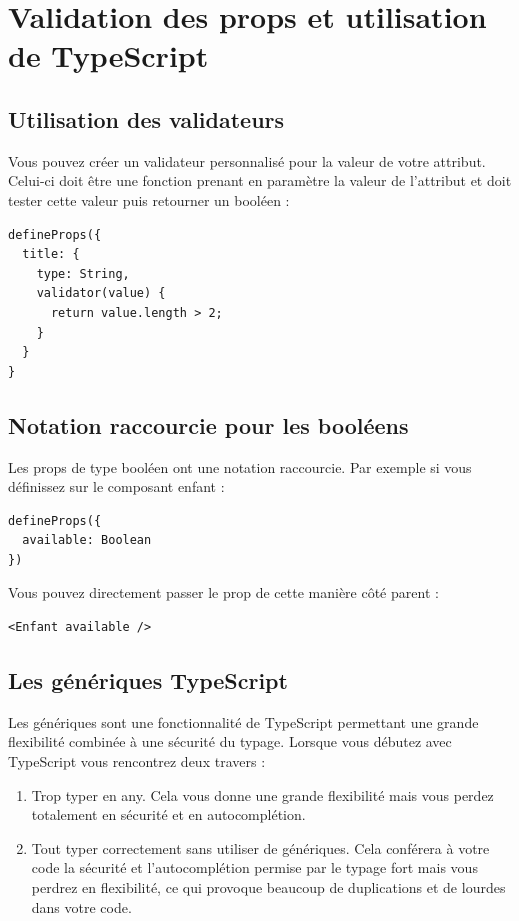 

\section{Validation des props et utilisation de TypeScript}
\subsection{Utilisation des validateurs}
Vous pouvez créer un validateur personnalisé pour la valeur de votre attribut. Celui-ci doit être une fonction prenant en paramètre la valeur de l'attribut et doit tester cette valeur puis retourner un booléen :
\begin{verbatim}
defineProps({
  title: {
    type: String,
    validator(value) {
      return value.length > 2;
    }
  }
}
\end{verbatim}

\subsection{Notation raccourcie pour les booléens}
Les {\color{monOrange}props} de type booléen ont une notation raccourcie. Par exemple si vous définissez sur le composant enfant :
\begin{verbatim}
defineProps({
  available: Boolean
})
\end{verbatim}
Vous pouvez directement passer le {\color{monOrange}prop} de cette manière côté parent :
\begin{verbatim}
<Enfant available />
\end{verbatim}

\subsection{Les génériques TypeScript}
Les génériques sont une fonctionnalité de {\color{monOrange}TypeScript} permettant une grande flexibilité combinée à une sécurité du typage. Lorsque vous débutez avec {\color{monOrange}TypeScript} vous rencontrez deux travers :
\begin{enumerate}
\item Trop typer en {\color{monOrange}any}. Cela vous donne une grande flexibilité mais vous perdez totalement en sécurité et en autocomplétion.

\item Tout typer correctement sans utiliser de génériques. Cela conférera à votre code la sécurité et l'autocomplétion permise par le typage fort mais vous perdrez en flexibilité, ce qui provoque beaucoup de duplications et de lourdes dans votre code.
\end{enumerate}


